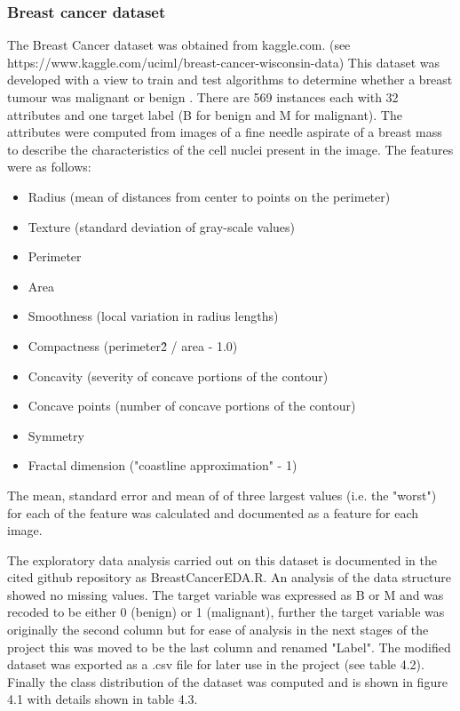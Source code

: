 \subsubsection{Breast cancer dataset}
The Breast Cancer dataset was obtained from kaggle.com. \newline
(see https://www.kaggle.com/uciml/breast-cancer-wisconsin-data) \newline
This dataset was developed with a view to train and test algorithms to determine whether a breast tumour was malignant or benign \citep{OLMangasarian:1994ue}. \newline
There are  569 instances each with 32 attributes and one target label (B for benign and M for malignant).\newline
The attributes were computed from images of a fine needle aspirate of a breast mass to describe the characteristics of the cell nuclei present in the image. The features were as follows:
\begin{itemize}
    \item Radius (mean of distances from center to points on the perimeter)
    \item Texture (standard deviation of gray-scale values) 
    \item Perimeter 
    \item Area 
    \item Smoothness (local variation in radius lengths) 
    \item Compactness (perimeter\^2 / area - 1.0)
    \item Concavity (severity of concave portions of the contour)
    \item Concave points (number of concave portions of the contour)
    \item Symmetry
    \item Fractal dimension ("coastline approximation" - 1)
\end{itemize}
The mean, standard error and mean of of three largest values (i.e. the "worst") for each of the feature was calculated and documented as a feature for each image.\newline

The exploratory data analysis carried out on this dataset is documented in the cited github repository as BreastCancerEDA.R.\newline
An analysis of the data structure showed no missing values. The target variable was expressed as B or M and was recoded to be either 0 (benign) or 1 (malignant), further the target variable was originally the second column but for ease of analysis in the next stages of the project this was moved to be the last column and renamed "Label".\newline
The modified dataset was exported as a .csv file for later use in the project (see table 4.2).\newline
Finally the class distribution of the dataset was computed and is shown in figure 4.1 with details shown in table 4.3.\newline 


